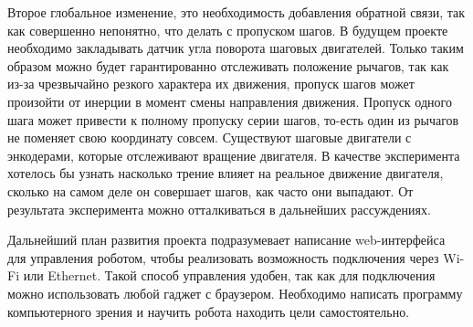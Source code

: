 Второе глобальное изменение, это необходимость добавления обратной связи, так как совершенно непонятно, что делать с пропуском шагов. В будущем проекте необходимо закладывать датчик угла поворота шаговых двигателей. Только таким образом можно будет гарантированно отслеживать положение рычагов, так как из-за чрезвычайно резкого характера их движения, пропуск шагов может произойти от инерции в момент смены направления движения. Пропуск одного шага может привести к полному пропуску серии шагов, то-есть один из рычагов не поменяет свою координату совсем. Существуют шаговые двигатели с энкодерами, которые отслеживают вращение двигателя. В качестве эксперимента хотелось бы узнать насколько трение влияет на реальное движение двигателя, сколько на самом деле он совершает шагов, как часто они выпадают. От результата эксперимента можно отталкиваться в дальнейших рассуждениях.

Дальнейший план развития проекта подразумевает написание web-интерфейса для управления роботом, чтобы реализовать возможность подключения через Wi-Fi или Ethernet. Такой способ управления удобен, так как для подключения можно использовать любой гаджет с браузером. Необходимо написать программу компьютерного зрения и научить робота находить цели самостоятельно.  
